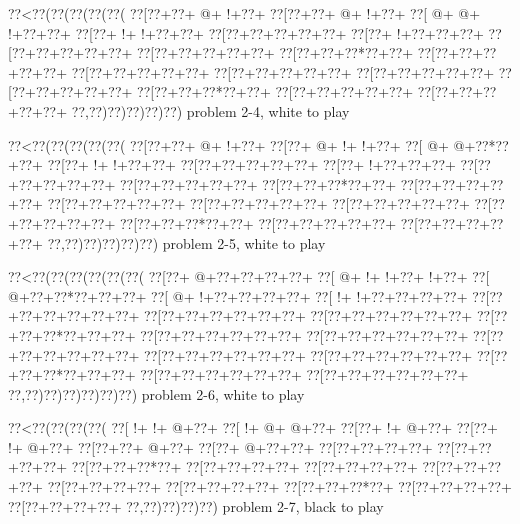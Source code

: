 \vbox{\vbox{\goo
\0??<\0??(\0??(\0??(\0??(\0??(
\0??[\0??+\0??+\- @+\- !+\0??+
\0??[\0??+\0??+\- @+\- !+\0??+
\0??[\- @+\- @+\- !+\0??+\0??+
\0??[\0??+\- !+\- !+\0??+\0??+
\0??[\0??+\0??+\0??+\0??+\0??+
\0??[\0??+\- !+\0??+\0??+\0??+
\0??[\0??+\0??+\0??+\0??+\0??+
\0??[\0??+\0??+\0??+\0??+\0??+
\0??[\0??+\0??+\0??*\0??+\0??+
\0??[\0??+\0??+\0??+\0??+\0??+
\0??[\0??+\0??+\0??+\0??+\0??+
\0??[\0??+\0??+\0??+\0??+\0??+
\0??[\0??+\0??+\0??+\0??+\0??+
\0??[\0??+\0??+\0??+\0??+\0??+
\0??[\0??+\0??+\0??*\0??+\0??+
\0??[\0??+\0??+\0??+\0??+\0??+
\0??[\0??+\0??+\0??+\0??+\0??+
\0??,\0??)\0??)\0??)\0??)\0??)
}
\hfil problem 2-4, white to play\hfil\break
}

\vbox{\vbox{\goo
\0??<\0??(\0??(\0??(\0??(\0??(
\0??[\0??+\0??+\- @+\- !+\0??+
\0??[\0??+\- @+\- !+\- !+\0??+
\0??[\- @+\- @+\0??*\0??+\0??+
\0??[\0??+\- !+\- !+\0??+\0??+
\0??[\0??+\0??+\0??+\0??+\0??+
\0??[\0??+\- !+\0??+\0??+\0??+
\0??[\0??+\0??+\0??+\0??+\0??+
\0??[\0??+\0??+\0??+\0??+\0??+
\0??[\0??+\0??+\0??*\0??+\0??+
\0??[\0??+\0??+\0??+\0??+\0??+
\0??[\0??+\0??+\0??+\0??+\0??+
\0??[\0??+\0??+\0??+\0??+\0??+
\0??[\0??+\0??+\0??+\0??+\0??+
\0??[\0??+\0??+\0??+\0??+\0??+
\0??[\0??+\0??+\0??*\0??+\0??+
\0??[\0??+\0??+\0??+\0??+\0??+
\0??[\0??+\0??+\0??+\0??+\0??+
\0??,\0??)\0??)\0??)\0??)\0??)
}
\hfil problem 2-5, white to play\hfil\break
}

\vbox{\vbox{\goo
\0??<\0??(\0??(\0??(\0??(\0??(\0??(
\0??[\0??+\- @+\0??+\0??+\0??+\0??+
\0??[\- @+\- !+\- !+\0??+\- !+\0??+
\0??[\- @+\0??+\0??*\0??+\0??+\0??+
\0??[\- @+\- !+\0??+\0??+\0??+\0??+
\0??[\- !+\- !+\0??+\0??+\0??+\0??+
\0??[\0??+\0??+\0??+\0??+\0??+\0??+
\0??[\0??+\0??+\0??+\0??+\0??+\0??+
\0??[\0??+\0??+\0??+\0??+\0??+\0??+
\0??[\0??+\0??+\0??*\0??+\0??+\0??+
\0??[\0??+\0??+\0??+\0??+\0??+\0??+
\0??[\0??+\0??+\0??+\0??+\0??+\0??+
\0??[\0??+\0??+\0??+\0??+\0??+\0??+
\0??[\0??+\0??+\0??+\0??+\0??+\0??+
\0??[\0??+\0??+\0??+\0??+\0??+\0??+
\0??[\0??+\0??+\0??*\0??+\0??+\0??+
\0??[\0??+\0??+\0??+\0??+\0??+\0??+
\0??[\0??+\0??+\0??+\0??+\0??+\0??+
\0??,\0??)\0??)\0??)\0??)\0??)\0??)
}
\hfil problem 2-6, white to play\hfil\break
}

\vbox{\vbox{\goo
\0??<\0??(\0??(\0??(\0??(
\0??[\- !+\- !+\- @+\0??+
\0??[\- !+\- @+\- @+\0??+
\0??[\0??+\- !+\- @+\0??+
\0??[\0??+\- !+\- @+\0??+
\0??[\0??+\0??+\- @+\0??+
\0??[\0??+\- @+\0??+\0??+
\0??[\0??+\0??+\0??+\0??+
\0??[\0??+\0??+\0??+\0??+
\0??[\0??+\0??+\0??*\0??+
\0??[\0??+\0??+\0??+\0??+
\0??[\0??+\0??+\0??+\0??+
\0??[\0??+\0??+\0??+\0??+
\0??[\0??+\0??+\0??+\0??+
\0??[\0??+\0??+\0??+\0??+
\0??[\0??+\0??+\0??*\0??+
\0??[\0??+\0??+\0??+\0??+
\0??[\0??+\0??+\0??+\0??+
\0??,\0??)\0??)\0??)\0??)
}
\hfil problem 2-7, black to play\hfil\break
}

